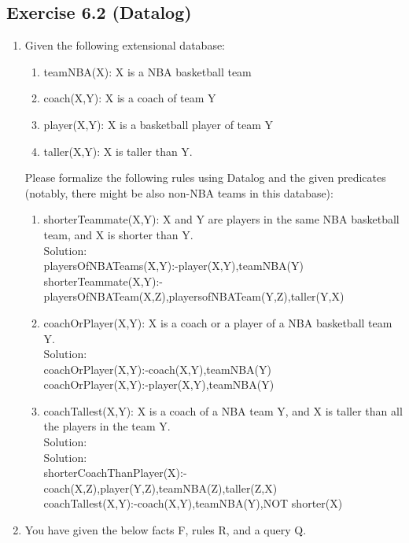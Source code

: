 \documentclass[10pt]{article}
\begin{document}
	\subsection*{Exercise 6.2 (Datalog)}
	\begin{enumerate}
	    \item Given the following extensional database: 
	    \begin{enumerate}
	        \item teamNBA(X): X is a NBA basketball team 
	        \item coach(X,Y): X is a coach of team Y 
	        \item player(X,Y): X is a basketball player of team Y 
	        \item taller(X,Y): X is taller than Y. 
	    \end{enumerate}
	    Please formalize the following rules using Datalog and the given predicates (notably, there might be also non-NBA teams in 			this database):
	    \begin{enumerate}
	        \item  shorterTeammate(X,Y): X and Y are players in the same NBA basketball team, and X is shorter than Y.
	        \\Solution:
	        \\playersOfNBATeams(X,Y):-player(X,Y),teamNBA(Y)
	        \\shorterTeammate(X,Y):-playersOfNBATeam(X,Z),playersofNBATeam(Y,Z),taller(Y,X)
	        \item coachOrPlayer(X,Y): X is a coach or a player of a NBA basketball team Y.
	        \\Solution:
	        \\coachOrPlayer(X,Y):-coach(X,Y),teamNBA(Y)
	        \\coachOrPlayer(X,Y):-player(X,Y),teamNBA(Y)
	        \item coachTallest(X,Y): X is a coach of a NBA team Y, and X is taller than all the players in the team Y.
	        \\Solution:
	        \\Solution:
	        \\shorterCoachThanPlayer(X):-coach(X,Z),player(Y,Z),teamNBA(Z),taller(Z,X)
	        \\coachTallest(X,Y):-coach(X,Y),teamNBA(Y),NOT shorter(X)
	    \end{enumerate}
	    \item You have given the below facts F, rules R, and a query Q.
	    \begin{enumerate}

\end{enumerate}
\end{enumerate}
\end{document}

